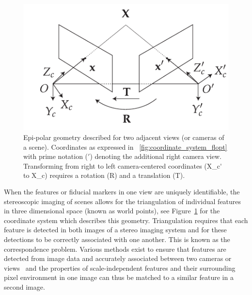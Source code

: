 \documentclass[times, twoside, watermark]{zHenriquesLab-StyleBioRxiv}
\begin{document}
\begin{figure}
  \centering
  \includegraphics{./figures/epi-polar-geom}
  \caption[Epi-polar geometry described for two adjacent views]{
  Epi-polar geometry described for two adjacent views (or cameras of a scene).
  Coordinates as expressed in \figurename~\ref{fig:coordinate_system_flopt} with prime notation (\('\)) denoting the additional right camera view.
  Transforming from right to left camera-centered coordinates (\gls*{X_c'} to \gls*{X_c}) requires a rotation (\gls*{R}) and a translation (\gls*{T}).
  }\label{fig:epi-polar-geom}
\end{figure}




When the features or fiducial markers in one view are uniquely identifiable, the stereoscopic imaging of scenes allows for the triangulation of individual features in three dimensional space (known as world points), see Figure~\ref{fig:epi-polar-geom} for the coordinate system which describes this geometry. %
Triangulation requires that each feature is detected in both images of a stereo imaging system and for these detections to be correctly associated with one another.
This is known as the correspondence problem.
Various methods exist to ensure that features are detected from image data and accurately associated between two cameras or views~\cite{szeliskiComputerVisionAlgorithms2010} and the properties of scale-independent features and their surrounding pixel environment in one image can thus be matched to a similar feature in a second image.
\end{document}
